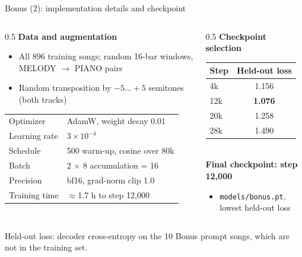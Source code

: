 \documentclass[aspectratio=169,11pt]{beamer}
\newcommand{\best}[1]{\textbf{\alert{#1}}}                       %
\newenvironment{tight}{\begin{itemize}\setlength{\itemsep}{1.5pt}\setlength{\parskip}{0pt}\setlength{\topsep}{0pt}}{\end{itemize}}
\newcommand{\src}[1]{\vfill{\scriptsize\color{gray}#1}}          %
\begin{document}
\begin{frame}[t]{Bonus (2): implementation details and checkpoint}
  \begin{columns}[T]
    \begin{column}{0.5\textwidth}
      \textbf{Data and augmentation}
      \begin{tight}\small
        \item All 896 training songs; random 16-bar windows, MELODY $\rightarrow$ PIANO pairs
        \item Random transposition by $-5\dots+5$ semitones (both tracks)
      \end{tight}
      \vspace{0.4em}
      {\small
      \begin{tabular}{@{}ll@{}}
        \toprule
        Optimizer & AdamW, weight decay 0.01 \\
        Learning rate & $3{\times}10^{-4}$ \\ Schedule & 500 warm-up, cosine over 80k \\
        Batch & 2 $\times$ 8 accumulation = 16 \\
        Precision & bf16, grad-norm clip 1.0 \\
        Training time & $\approx$1.7 h to step 12{,}000 \\
        \bottomrule
      \end{tabular}}
    \end{column}
    \begin{column}{0.5\textwidth}
      \textbf{Checkpoint selection}\\[0.3em]
      {\small
      \begin{tabular}{@{}lc@{}}
        \toprule
        Step & Held-out loss \\ \midrule
        4k & 1.156 \\
        12k & \best{1.076} \\
        20k & 1.258 \\
        28k & 1.490 \\
        \bottomrule
      \end{tabular}}\\[0.5em]
      \textbf{Final checkpoint: step 12{,}000}
      \begin{tight}\small
        \item \texttt{models/bonus.pt}, lowest held-out loss
      \end{tight}
    \end{column}
  \end{columns}
  \src{Held-out loss: decoder cross-entropy on the 10 Bonus prompt songs, which are not in the training set.}
\end{frame}
\end{document}
